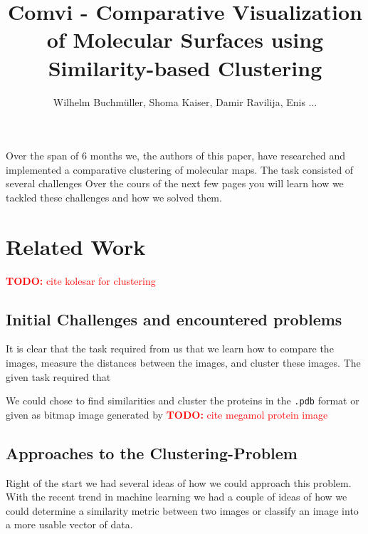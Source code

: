 \documentclass[journal]{vgtc}       %
\title{Comvi - Comparative Visualization of Molecular Surfaces using Similarity-based Clustering}
\author{Wilhelm Buchm\"uller, Shoma Kaiser, Damir Ravilija, Enis ...}
\newcommand{\todo}[1]{\textcolor{red}{\textbf{TODO:} #1}}
\begin{document}

\label{sec:intro}
%
\maketitle
%
Over the span of 6 months we, the authors of this paper,  have researched and implemented a comparative clustering of molecular maps.
The task consisted of several challenges
Over the cours of the next few pages you will learn how we tackled these challenges and how we solved them.

\section{Related Work}\label{sec:relatedWork}

\todo{cite kolesar for clustering}



\subsection{Initial Challenges and encountered problems}

It is clear that the task required from us that we learn how to compare the images, measure the distances between the images, and cluster these images.
The given task required that 

We could chose to find similarities and cluster the proteins in the \verb|.pdb| format or given as bitmap image generated by \todo{cite megamol protein image}



\subsection{Approaches to the Clustering-Problem}

Right of the start we had several ideas of how we could approach this problem. 
With the recent trend in machine learning we had a couple of ideas of how we could determine a similarity metric between two images or classify an image into a more usable vector of data.
\end{document}
